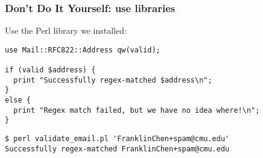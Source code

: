 \begin{frame}[fragile]
  \frametitle{Don't Do It Yourself: use libraries}

  Use the Perl library we installed:

  \begin{verbatim}
use Mail::RFC822::Address qw(valid);

if (valid $address) {
  print "Successfully regex-matched $address\n";
}
else {
  print "Regex match failed, but we have no idea where!\n";
}
  \end{verbatim}

  \begin{verbatim}
$ perl validate_email.pl 'FranklinChen+spam@cmu.edu'         
Successfully regex-matched FranklinChen+spam@cmu.edu
  \end{verbatim}

\end{frame}
